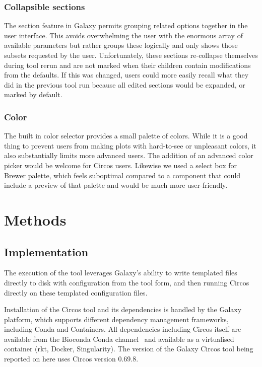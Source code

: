 \subsubsection*{Collapsible sections}

The section feature in Galaxy permits grouping related options together in the user interface. This avoids overwhelming the user with the enormous array of available parameters but rather groups these logically and only shows those subsets requested by the user. Unfortunately, these sections re-collapse themselves during tool rerun and are not marked when their children contain modifications from the defaults. If this was changed, users could more easily recall what they did in the previous tool run because all edited sections would be expanded, or marked by default.

\subsubsection*{Color}

The built in color selector provides a small palette of colors. While it is a good thing to prevent users from making plots with hard-to-see or unpleasant colors, it also substantially limits more advanced users. The addition of an advanced color picker would be welcome for Circos users. Likewise we used a select box for Brewer palette, which feels suboptimal compared to a component that could include a preview of that palette and would be much more user-friendly.


\section*{Methods}

\subsection*{Implementation}
The execution of the tool leverages Galaxy's ability to write templated files directly to disk with configuration from the tool form, and then running Circos directly on these templated configuration files.

Installation of the Circos tool and its dependencies is handled by the Galaxy platform, which supports different dependency management frameworks, including Conda and Containers. All dependencies including Circos itself are available from the Bioconda Conda channel~\cite{gruning2018bioconda} and available as a virtualised container (rkt, Docker, Singularity). The version of the Galaxy Circos tool being reported on here uses Circos version 0.69.8.


